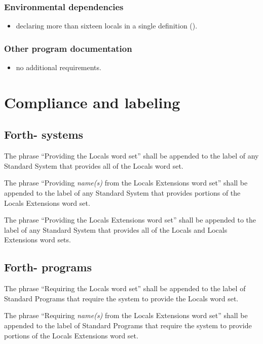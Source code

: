 \subsubsection{Environmental dependencies} %
\label{locals:environment}
\begin{itemize}
\item declaring more than sixteen locals in a single definition
	().
\end{itemize}

\subsubsection{Other program documentation} %
\begin{itemize}
\item no additional requirements.
\end{itemize}


\section{Compliance and labeling} %

\subsection{Forth-\snapshot{} systems} %

The phrase ``Providing the Locals word set'' shall be appended to
the label of any Standard System that provides all of the Locals
word set.

The phrase ``Providing \emph{name(s)} from the Locals Extensions
word set'' shall be appended to the label of any Standard System
that provides portions of the Locals Extensions word set.

The phrase ``Providing the Locals Extensions word set'' shall be
appended to the label of any Standard System that provides all of
the Locals and Locals Extensions word sets.

\subsection{Forth-\snapshot{} programs} %

The phrase ``Requiring the Locals word set'' shall be appended to
the label of Standard Programs that require the system to provide
the Locals word set.

The phrase ``Requiring \emph{name(s)} from the Locals Extensions
word set'' shall be appended to the label of Standard Programs that
require the system to provide portions of the Locals Extensions word
set.

